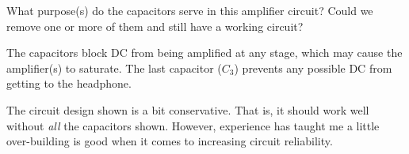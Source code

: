 

What purpose(s) do the capacitors serve in this amplifier circuit?  Could we remove one or more of them and still have a working circuit?







The capacitors block DC from being amplified at any stage, which may cause the amplifier(s) to saturate.  The last capacitor ($C_3$) prevents any possible DC from getting to the headphone.







The circuit design shown is a bit conservative.  That is, it should work well without {\it all} the capacitors shown.  However, experience has taught me a little over-building is good when it comes to increasing circuit reliability.



